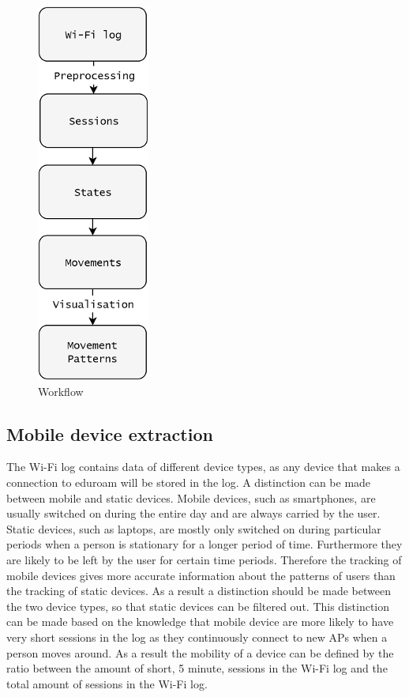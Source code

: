 \begin{figure}[H]
\centering
\includegraphics[scale=0.15]{ES-workflow}
\captionsetup{justification=centering}
\caption{Workflow}
\label{figure:ES-workflow}
\end{figure}

\subsection{Mobile device extraction}\label{ES-mobileDeviceExtraction}
The Wi-Fi log contains data of different device types, as any device that makes a connection to eduroam will be stored in the log. A distinction can be made between mobile and static devices. Mobile devices, such as smartphones, are usually switched on during the entire day and are always carried by the user. Static devices, such as laptops, are mostly only switched on during particular periods when a person is stationary for a longer period of time. Furthermore they are likely to be left by the user for certain time periods. Therefore the tracking of mobile devices gives more accurate information about the patterns of users than the tracking of static devices. As a result a distinction should be made between the two device types, so that static devices can be filtered out. This distinction can be made based on the knowledge that mobile device are more likely to have very short sessions in the log as they continuously connect to new APs when a person moves around. As a result the mobility of a device can be defined by the ratio between the amount of short, 5 minute, sessions in the Wi-Fi log and the total amount of sessions in the Wi-Fi log.

